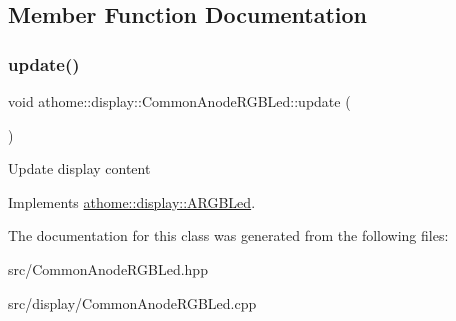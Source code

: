 \subsection{Member Function Documentation}
\mbox{\label{classathome_1_1display_1_1_common_anode_r_g_b_led_ab7daf7dcc6ac1e3fcab202cae484b237}} 
\subsubsection{\texorpdfstring{update()}{update()}}
{\footnotesize\ttfamily void athome\+::display\+::\+Common\+Anode\+R\+G\+B\+Led\+::update (\begin{DoxyParamCaption}{ }\end{DoxyParamCaption})\hspace{0.3cm}{\ttfamily [virtual]}}

Update display content 

Implements \mbox{\hyperlink{classathome_1_1display_1_1_a_r_g_b_led_a725ceca0c01735daa9c95148baf075ab}{athome\+::display\+::\+A\+R\+G\+B\+Led}}.



The documentation for this class was generated from the following files\+:\begin{DoxyCompactItemize}
\item 
src/Common\+Anode\+R\+G\+B\+Led.\+hpp\item 
src/display/Common\+Anode\+R\+G\+B\+Led.\+cpp\end{DoxyCompactItemize}
